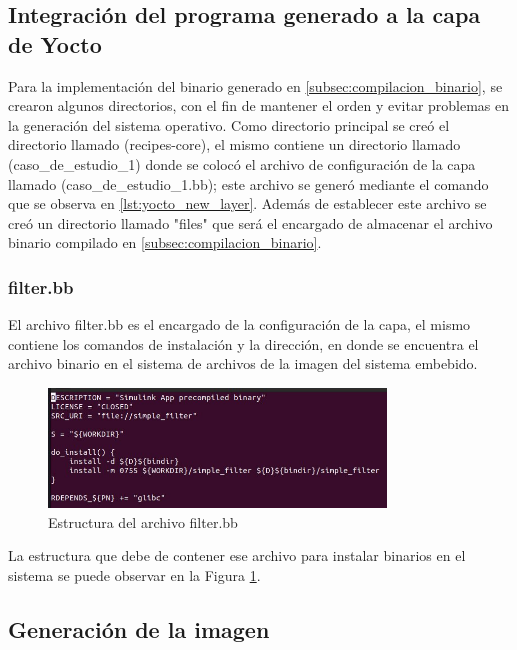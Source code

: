 \subsection{Integración del programa generado a la capa de Yocto}

Para la implementación del binario generado en \ref{subsec:compilacion_binario}, se crearon algunos directorios, con el fin de mantener el orden y evitar problemas en la generación del sistema operativo. Como directorio principal se creó el directorio llamado (recipes-core), el mismo contiene un directorio llamado (caso\_de\_estudio\_1) donde se colocó el archivo de configuración de la capa llamado (caso\_de\_estudio\_1.bb); este archivo se generó mediante el comando que se observa en \ref{lst:yocto_new_layer}. Además de establecer este archivo se creó un directorio llamado "files" que será el encargado de almacenar el archivo binario compilado en \ref{subsec:compilacion_binario}.

\subsubsection{filter.bb}

El archivo filter.bb es el encargado de la configuración de la capa, el mismo contiene los comandos de instalación y la dirección, en donde se encuentra el archivo binario en el sistema de archivos de la imagen del sistema embebido.

\begin{figure}[h!]
    \centering
    \includegraphics[width=0.8\textwidth]{fig/especifico_2/bbfilestructure.jpg}
    \caption{Estructura del archivo filter.bb}
    \label{fig:estructura_archivo_bb}
\end{figure}

La estructura que debe de contener ese archivo para instalar binarios en el sistema se puede observar en la Figura \ref{fig:estructura_archivo_bb}.

\subsection{Generación de la imagen}\label{subsec:generacion_imagen_minima}


